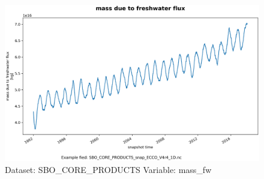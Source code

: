 \begin{figure}[H]
\centering
\includegraphics[width=\textwidth]{../images/plots/oneD_plots/SBO_Core_Products/mass_fw.png}
\caption{Dataset: SBO\_CORE\_PRODUCTS Variable: mass\_fw}
\label{tab:table-SBO_CORE_PRODUCTS_mass_fw-Plot}
\end{figure}
\pagebreak
